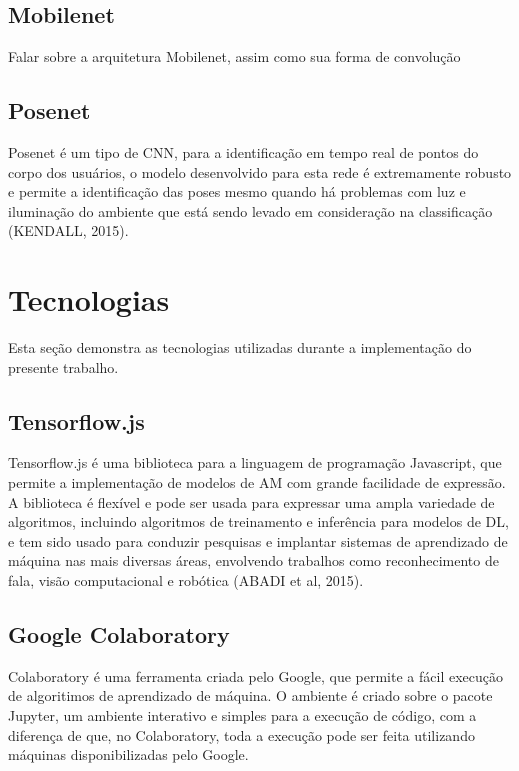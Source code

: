 \subsection{Mobilenet}

Falar sobre a arquitetura Mobilenet, assim como sua forma de convolução

\subsection{Posenet}

\par Posenet é um tipo de CNN, para a identificação em tempo real de pontos do corpo dos usuários, o modelo desenvolvido para esta rede é extremamente robusto e permite a identificação das poses mesmo quando há problemas com luz e iluminação do ambiente que está sendo levado em consideração na classificação (KENDALL, 2015). 

\section{Tecnologias}

Esta seção demonstra as tecnologias utilizadas durante a implementação do presente trabalho.

\subsection{Tensorflow.js}

Tensorflow.js é uma biblioteca para a linguagem de programação Javascript, que permite a implementação de modelos de AM com grande facilidade de expressão. A biblioteca é flexível e pode ser usada para expressar uma ampla variedade de algoritmos, incluindo algoritmos de treinamento e inferência para modelos de DL, e tem sido usado para conduzir pesquisas e implantar sistemas de aprendizado de máquina nas mais diversas áreas, envolvendo trabalhos como reconhecimento de fala, visão computacional e robótica (ABADI et al, 2015). 

\subsection{Google Colaboratory}

Colaboratory é uma ferramenta criada pelo Google, que permite a fácil execução de algoritimos de aprendizado de máquina. O ambiente é criado sobre o pacote Jupyter, um ambiente interativo e simples para a execução de código, com a diferença de que, no Colaboratory, toda a execução pode ser feita utilizando máquinas disponibilizadas pelo Google.

